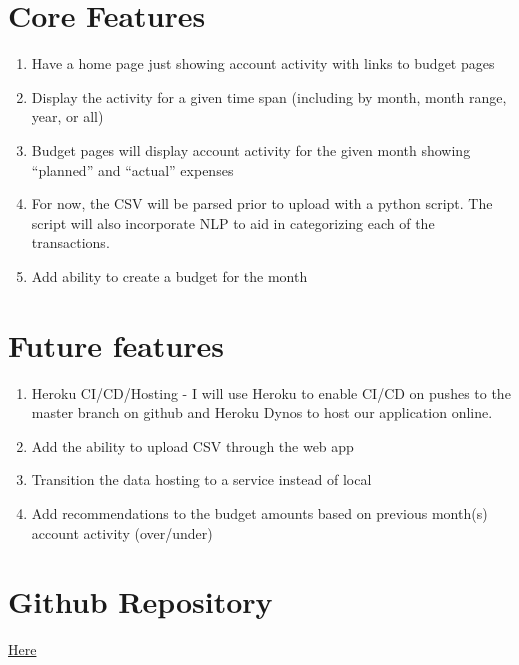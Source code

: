 \documentclass[preprint,11pt,3p]{article}
\begin{document}
\section{Core Features}
\begin{enumerate}
	\item Have a home page just showing account activity with links to budget pages
	\item Display the activity for a given time span (including by month, month range, year, or all)
	\item Budget pages will display account activity for the given month showing ``planned'' and ``actual'' expenses
	\item For now, the CSV will be parsed prior to upload with a python script. The script will also incorporate NLP to aid in categorizing each of the transactions.
	\item Add ability to create a budget for the month
\end{enumerate}

\section{Future features}
\begin{enumerate}
	\item Heroku CI/CD/Hosting - I will use Heroku to enable CI/CD on pushes to the master branch on github and Heroku Dynos to host our application online.
	\item Add the ability to upload CSV through the web app
	\item Transition the data hosting to a service instead of local
	\item Add recommendations to the budget amounts based on previous month(s) account activity (over/under)
\end{enumerate}	


\section{Github Repository}
\href{https://github.com/ericaltenburg/ab}{Here}
\end{document}
